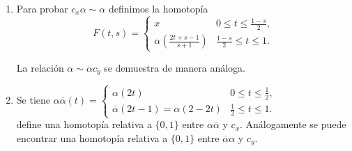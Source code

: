 \documentclass[bibtex, anon]{TEMat-article}
\begin{document}
\begin{demostracion}
\begin{enumerate}
		\item Para probar $c_x\alpha\sim\alpha$ definimos la homotopía
		\[
		F(t,s)=\left\{\begin{array}{lcc}
		x &  0\leq t\leq\frac{1-s}{2},\\
		\alpha\left(\frac{2t+s-1}{s+1}\right)  & \frac{1-s}{2}\leq t\leq 1.
		\end{array}\right.
		\]
		
		La relación $\alpha\sim\alpha c_y$ se demuestra de manera análoga.
		
		\item Se tiene $\alpha\overline{\alpha}(t)=\left\{\begin{array}{lc}
		\alpha(2t) & 0\leq t\leq\frac{1}{2},\\
		\overline{\alpha}(2t-1)=\alpha(2-2t) & \frac{1}{2}\leq t\leq 1.
		\end{array}\right.$\\
		
%		
%		
		
		
		define una homotopía relativa a $\{0,1\}$ entre $\alpha\overline{\alpha}$ y $c_x$. Análogamente se puede encontrar una homotopía relativa a $\{0,1\}$ entre $\overline{\alpha}\alpha$ y $c_y$.
	\end{enumerate}
\end{demostracion}
\end{document}
